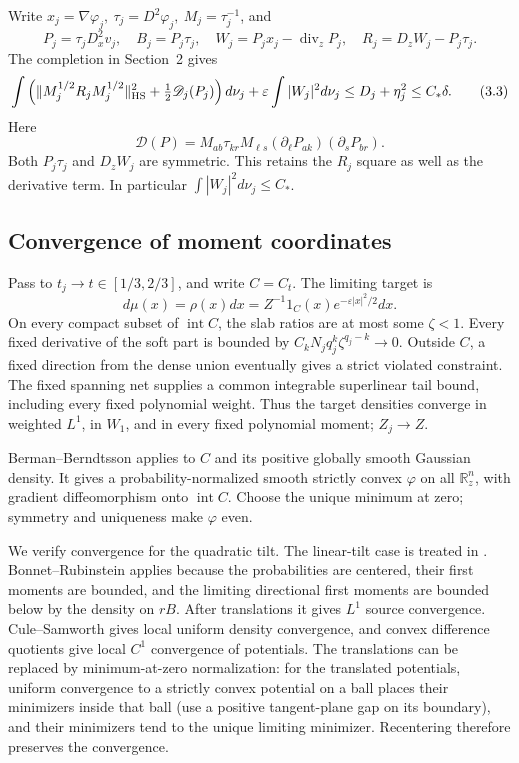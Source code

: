 \documentclass[11pt,reqno]{amsart}
\numberwithin{equation}{section}
\theoremstyle{remark}
\theoremstyle{definition}
\begin{document}
Write \(x_j=\nabla\varphi_j,\ \tau_j=D^2\varphi_j,\ M_j=\tau_j^{-1}\), and
\[
P_j=\tau_jD_x^2v_j,\quad B_j=P_j\tau_j,\quad
W_j=P_jx_j-\operatorname{div}_zP_j,\quad
R_j=D_zW_j-P_j\tau_j.
\]
The completion in Section~2 gives
\[
\int\left(\|M_j^{1/2}R_jM_j^{1/2}\|_{\rm HS}^2+
\tfrac12\mathscr D_j(P_j)\right)d\nu_j
+\varepsilon\int|W_j|^2d\nu_j
\le D_j+\eta_j^2\le C_*\delta.                       \tag{3.3}
\]
Here
\[
\mathscr D(P)=M_{ab}\tau_{kr}M_{\ell s}
(\partial_\ell P_{ak})(\partial_sP_{br}).
\]
Both \(P_j\tau_j\) and \(D_zW_j\) are symmetric. This retains the \(R_j\) square as well as the derivative term. In particular \(\int|W_j|^2d\nu_j\le C_*\).

\subsection{Convergence of moment coordinates}

Pass to \(t_j\to t\in[1/3,2/3]\), and write \(C=C_t\). The limiting target is
\[
d\mu(x)=\rho(x)dx=Z^{-1}1_C(x)e^{-\varepsilon|x|^2/2}dx.                \tag{3.4}
\]
On every compact subset of \(\operatorname{int}C\), the slab ratios are at most some \(\zeta<1\). Every fixed derivative of the soft part is bounded by \(C_kN_jq_j^k\zeta^{q_j-k}\to0\). Outside \(C\), a fixed direction from the dense union eventually gives a strict violated constraint. The fixed spanning net supplies a common integrable superlinear tail bound, including every fixed polynomial weight. Thus the target densities converge in weighted \(L^1\), in \(W_1\), and in every fixed polynomial moment; \(Z_j\to Z\).

Berman--Berndtsson \cite[Theorem 1.1]{BB} applies to \(C\) and its positive globally smooth Gaussian density. It gives a probability-normalized smooth strictly convex \(\varphi\) on all \(\mathbb R_z^n\), with gradient diffeomorphism onto \(\operatorname{int}C\). Choose the unique minimum at zero; symmetry and uniqueness make \(\varphi\) even.

We verify convergence for the quadratic tilt. The linear-tilt case is treated in \cite[Lemma 3.4]{LSX}. Bonnet--Rubinstein \cite[Theorem 1.3]{BR} applies because the probabilities are centered, their first moments are bounded, and the limiting directional first moments are bounded below by the density on \(rB\). After translations it gives \(L^1\) source convergence. Cule--Samworth \cite[Proposition 2]{CS} gives local uniform density convergence, and convex difference quotients give local \(C^1\) convergence of potentials. The translations can be replaced by minimum-at-zero normalization: for the translated potentials, uniform convergence to a strictly convex potential on a ball places their minimizers inside that ball (use a positive tangent-plane gap on its boundary), and their minimizers tend to the unique limiting minimizer. Recentering therefore preserves the convergence.
\end{document}
